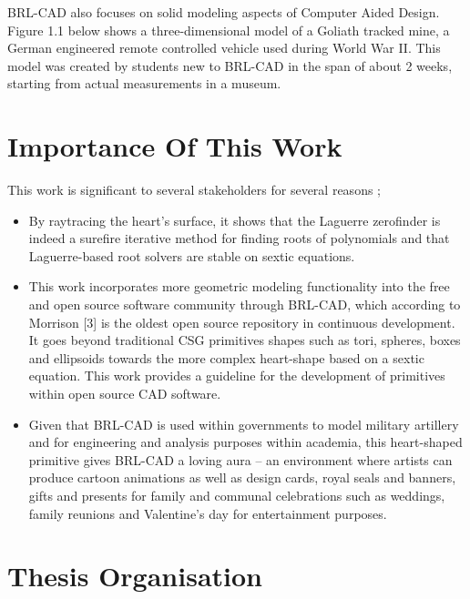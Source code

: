 \hspace{30} BRL­-CAD also focuses on solid modeling aspects of Computer ­Aided
Design. Figure 1.1 below shows a three-­dimensional model of a Goliath tracked
mine, a German engineered remote controlled vehicle used during World War II.
This model was created by students new to BRL-­CAD in the span of about 2
weeks, starting from actual measurements in a museum.


\section{Importance Of This Work}

This work is significant to several stakeholders for several reasons ;

\begin{itemize}
\item By ray­tracing the heart's surface, it shows that the Laguerre zero­finder is indeed a sure­fire iterative
method for finding roots of polynomials and that Laguerre-­based root 
solvers are stable on sextic equations.
\item This work incorporates more geometric modeling functionality into 
the free and open source software community through BRL-­CAD, which according 
to Morrison [3] is the oldest open source repository in continuous development.
It goes beyond traditional CSG primitives shapes such as tori, spheres, boxes and 
ellipsoids towards the more complex heart-shape based on a sextic equation. 
This work provides a guideline for the development of primitives within open source CAD software.
\item Given that BRL­-CAD is used within governments to model military artillery
 and for engineering and analysis purposes within academia, this
heart­-shaped primitive gives BRL-­CAD a loving aura – an 
environment where artists can produce cartoon animations as well as
design cards, royal seals and banners, gifts and presents for family and
communal celebrations such as weddings, family reunions and
Valentine's day for entertainment purposes.
\end{itemize}


\section{Thesis Organisation}


